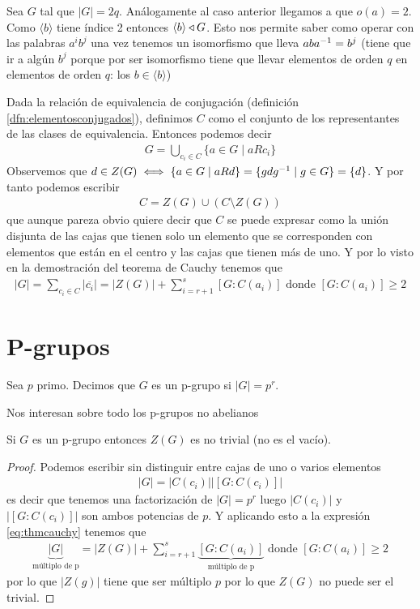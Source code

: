 \begin{ej}
	Sea $G$ tal que $|G| = 2q$. Análogamente al caso anterior llegamos a que $o(a) = 2$. Como $\langle b \rangle$ tiene índice 2 entonces $\langle b \rangle \mathbin{\triangleleft} G$. Esto nos permite saber como operar con las palabras $a^ib^j$ una vez tenemos un isomorfismo que lleva $a b a^{-1} = b^j$ (tiene que ir a algún $b^j$ porque por ser isomorfismo tiene que llevar elementos de orden $q$ en elementos de orden $q$: los $b \in \langle b \rangle$)
\end{ej}

Dada la relación de equivalencia de conjugación (definición \ref{dfn:elementosconjugados}), definimos $C$ como el conjunto de los representantes de las clases de equivalencia. Entonces podemos decir
\begin{align*}
G = \bigcup_{c_i \in C} \{a \in G \mid a R c_i\}
\end{align*}
Observemos que $d \in Z(G) \iff \{a \in G \mid a R d\} = \{gdg^{-1} \mid g \in G\} = \{d\}$. Y por tanto podemos escribir
\begin{align*}
C = Z(G) \cup (C\setminus Z(G))
\end{align*}
que aunque pareza obvio quiere decir que $C$ se puede expresar como la unión disjunta de las cajas que tienen solo un elemento que se corresponden con elementos que están en el centro y las cajas que tienen más de uno. Y por lo visto en la demostración del teorema de Cauchy tenemos que
\begin{align*}
|G| = \sum_{c_i \in C} | \overline{c_i} | = |Z(G)| + \sum_{i = r + 1}^{s} [G : C(a_i)] \text{ donde } [G : C(a_i)] \geq 2
\end{align*}

\section{P-grupos}

\begin{dfn}[P-grupo]
	Sea $p$ primo. Decimos que $G$ es un p-grupo si $|G| = p^r$.
\end{dfn}

Nos interesan sobre todo los p-grupos no abelianos

\begin{thm}
	Si $G$ es un p-grupo entonces $Z(G)$ es no trivial (no es el vacío).
\end{thm}

\begin{proof}
	Podemos escribir sin distinguir entre cajas de uno o varios elementos
	\begin{align*}
	|G| = |C(c_i)||[G:C(c_i)]|
	\end{align*}
	es decir que tenemos una factorización de $|G| = p^r$ luego $|C(c_i)|$ y $|[G:C(c_i)]|$ son ambos potencias de $p$. Y aplicando esto a la expresión \ref{eq:thmcauchy} tenemos que
	\begin{align*}
	\underbrace{|G|}_{\text{múltiplo de p}} = |Z(G)| + \sum_{i = r + 1}^{s} \underbrace{[G : C(a_i)]}_{\text{múltiplo de p}} \text{ donde } [G : C(a_i)] \geq 2
	\end{align*}
	por lo que $|Z(g)|$ tiene que ser múltiplo $p$ por lo que $Z(G)$ no puede ser el trivial.
\end{proof}

